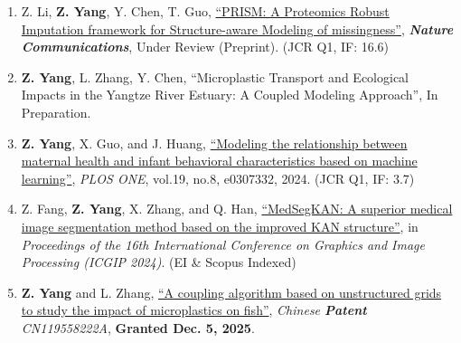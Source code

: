 \documentclass[10pt, letterpaper]{article}
\begin{document}
\begin{enumerate}[leftmargin=*, labelwidth=1.5em, align=left, itemindent=0pt, labelsep=0.5em]

        

            \item Z. Li, \textbf{Z. Yang}, Y. Chen, T. Guo, 
         \href{https://doi.org/10.21203/rs.3.rs-7480159/v1}{\enquote{PRISM: A Proteomics Robust Imputation framework for Structure-aware Modeling of missingness}}, 
        \textit{\textbf{Nature Communications}}, Under Review (Preprint). (JCR Q1, IF: 16.6)

        
    \item \textbf{Z. Yang}, L. Zhang, Y. Chen,
    \enquote{Microplastic Transport and Ecological Impacts in the Yangtze River Estuary: A Coupled Modeling Approach}, 
  In Preparation. 





    \item \textbf{Z. Yang}, X. Guo, and J. Huang, 
        \href{https://doi.org/10.1371/journal.pone.0307332}{\enquote{Modeling the relationship between maternal health and infant behavioral characteristics based on machine learning}}, 
        \textit{PLOS ONE}, vol.19, no.8, e0307332, 2024. (JCR Q1, IF: 3.7)

    \item Z. Fang, \textbf{Z. Yang}, X. Zhang, and Q. Han, 
        \href{https://doi.org/10.1117/12.3057735}{\enquote{MedSegKAN: A superior medical image segmentation method based on the improved KAN structure}}, 
        in \textit{Proceedings of the 16th International Conference on Graphics and Image Processing (ICGIP 2024)}. (EI \& Scopus Indexed)

    \item \textbf{Z. Yang} and L. Zhang, 
       \href{https://patents.google.com/patent/CN119558222A/en?oq=CN+119558222}{\enquote{A coupling algorithm based on unstructured grids to study the impact of microplastics on fish}}, 
        \textit{Chinese \textbf{Patent} CN119558222A}, \textbf{Granted Dec. 5, 2025}.
\end{enumerate}
\end{document}
